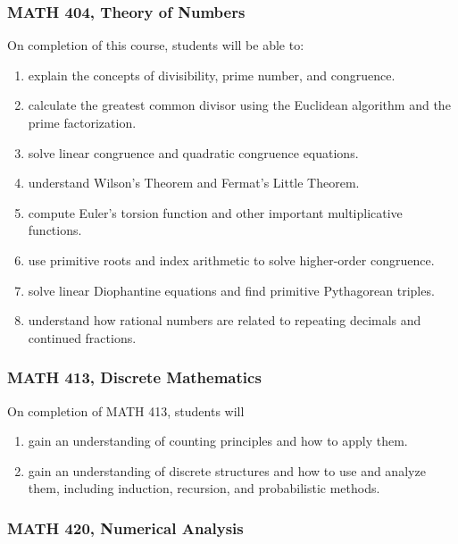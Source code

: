 \documentclass[11pt]{article}
\newenvironment{alphalist}{
\begin{enumerate}[label=(\arabic*),widest=107 ,leftmargin=25pt, itemsep=0pt]}
{\end{enumerate}}
\begin{document}
\subsubsection*{MATH 404, Theory of Numbers}

On completion of this course, students will be able to:
\begin{alphalist}
    \item explain the concepts of divisibility, prime number, and congruence. 
    \item calculate the greatest common divisor using the Euclidean algorithm and the prime factorization.
    \item solve linear congruence and quadratic congruence equations.
    \item understand Wilson's Theorem and Fermat's Little Theorem. 
    \item compute Euler's torsion function and other important multiplicative functions.
    \item use primitive roots and index arithmetic to solve higher-order congruence.  
    \item solve linear Diophantine equations and find primitive Pythagorean triples.
    \item understand how rational numbers are related to repeating decimals and continued fractions.
\end{alphalist}

\subsubsection*{MATH 413, Discrete Mathematics}

On completion of MATH 413, students will 
\begin{alphalist}
    \item gain an understanding of counting principles and how to apply them.
    \item gain an understanding of discrete structures and how to use and analyze them, including induction, recursion, and probabilistic methods.
\end{alphalist}

\subsubsection*{MATH 420, Numerical Analysis}
\end{document}
